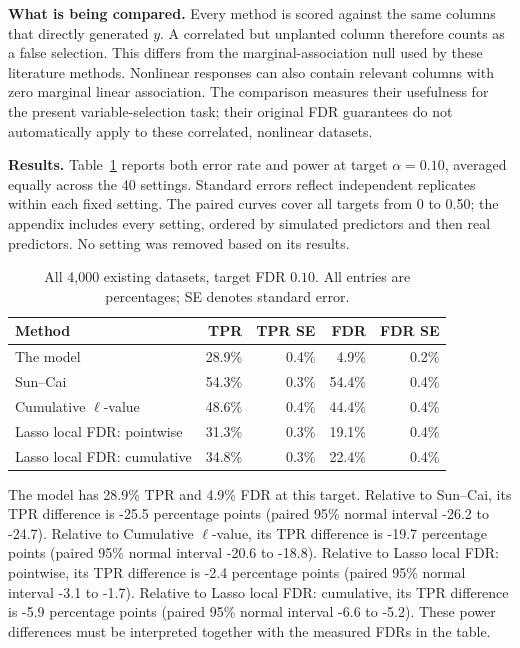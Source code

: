 \documentclass[10pt,letterpaper]{article}
\begin{document}
\textbf{What is being compared.} Every method is scored against the
same columns that directly generated $y$. A correlated but unplanted
column therefore counts as a false selection. This differs from the
marginal-association null used by these literature methods.
Nonlinear responses can also contain relevant columns with zero marginal
linear association. The comparison measures their usefulness for the
present variable-selection task; their original FDR guarantees do not
automatically apply to these correlated, nonlinear datasets.

\textbf{Results.} Table~\ref{tab:lfdr-comparison} reports both error rate
and power at target $\alpha=0.10$, averaged equally across the 40 settings.
Standard errors reflect independent replicates within each fixed setting.
The paired curves cover all targets from 0 to 0.50; the appendix includes
every setting, ordered by simulated predictors and then real predictors.
No setting was removed based on its results.
\begin{table}[H]
\centering\small
\begin{tabular}{lrrrr}
\toprule
Method & TPR & TPR SE & FDR & FDR SE\\
\midrule
The model & 28.9\% & 0.4\% & 4.9\% & 0.2\%\\
Sun--Cai & 54.3\% & 0.3\% & 54.4\% & 0.4\%\\
Cumulative $\ell$-value & 48.6\% & 0.4\% & 44.4\% & 0.4\%\\
Lasso local FDR: pointwise & 31.3\% & 0.3\% & 19.1\% & 0.4\%\\
Lasso local FDR: cumulative & 34.8\% & 0.3\% & 22.4\% & 0.4\%\\
\bottomrule
\end{tabular}
\caption{All 4,000 existing datasets, target FDR $0.10$. All entries are percentages; SE denotes standard error.}
\label{tab:lfdr-comparison}
\end{table}
The model has 28.9\% TPR and 4.9\% FDR at this target. Relative to Sun--Cai, its TPR difference is -25.5 percentage points (paired 95\% normal interval -26.2 to -24.7). Relative to Cumulative $\ell$-value, its TPR difference is -19.7 percentage points (paired 95\% normal interval -20.6 to -18.8). Relative to Lasso local FDR: pointwise, its TPR difference is -2.4 percentage points (paired 95\% normal interval -3.1 to -1.7). Relative to Lasso local FDR: cumulative, its TPR difference is -5.9 percentage points (paired 95\% normal interval -6.6 to -5.2). These power differences must be interpreted together with the measured FDRs in the table.
\end{document}
